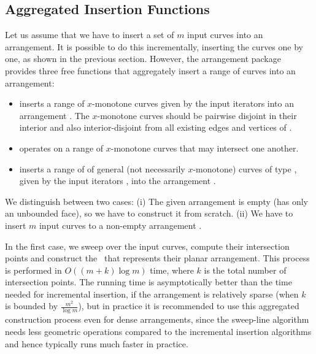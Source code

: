 
\subsection{Aggregated Insertion Functions\label{arr_ssec:agg_insert}}

Let us assume that we have to insert a set of $m$ input curves into an
arrangement. It is possible to do this incrementally, 
inserting the curves one by one, as shown in the previous section.
However, the arrangement package provides three free functions that
aggregately insert a range of curves into an arrangement:
%
\begin{itemize}
\item {} inserts 
a range of $x$-monotone curves given by the input iterators
\ccc{[begin, end)} into an arrangement . The $x$-monotone
curves should be pairwise disjoint in their interior and also
interior-disjoint from all existing edges and vertices of .
%
\item {} operates on
a range of $x$-monotone curves that may intersect one another.
%
\item {} inserts a range of
of general (not necessarily $x$-monotone) curves of type ,
given by the input iterators \ccc{[begin, end)}, into the arrangement
.
\end{itemize}

We distinguish between two cases: (i) The given arrangement
 is empty (has only an unbounded face), so we have to
construct it from scratch. (ii) We have to insert $m$ input curves
to a non-empty arrangement .

In the first case, we sweep over the input curves, compute
their intersection points and construct the \dcel\ that represents
their planar arrangement. This process is performed in
$O\left((m + k)\log m\right)$ time, where $k$ is the total number
of intersection points. The running time is asymptotically better
than the time needed for incremental insertion, if the arrangement
is relatively sparse (when $k$ is bounded by $\frac{m^2}{\log
m}$), but in practice it is recommended to use this aggregated
construction process even for dense arrangements, since the
sweep-line algorithm needs less geometric operations compared to
the incremental insertion algorithms and hence typically runs 
much faster in practice.

